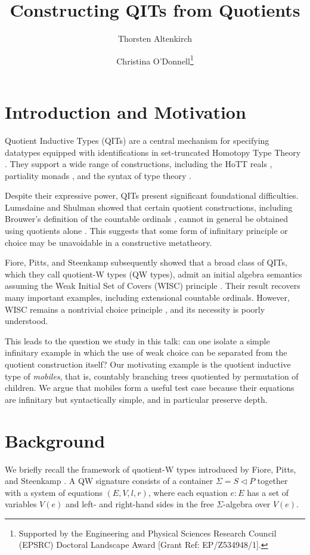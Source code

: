 \documentclass{easychair}
\title{Constructing QITs from Quotients}
\author{
    Thorsten Altenkirch\inst{1}
\and
    Christina O'Donnell\inst{1}\thanks{Supported by the Engineering and Physical Sciences Research Council (EPSRC) Doctoral Landscape Award [Grant Ref: EP/Z534948/1].}
}
\institute{
    University of Nottingham, UK\\
    \email{\{psztxa,psxco3\}@nottingham.ac.uk}
}
\begin{document}
\maketitle

\section{Introduction and Motivation}

Quotient Inductive Types (QITs) are a central mechanism for specifying
datatypes equipped with identifications in set-truncated Homotopy Type
Theory \cite{hott2013-book}. They support a wide range of constructions,
including the HoTT reals \cite{hott2013-book}, partiality monads
\cite{altenkirch2017-partiality-monad}, and the syntax of type theory
\cite{altenkirch2018-qiit}.

Despite their expressive power, QITs present significant foundational
difficulties. Lumsdaine and Shulman showed that certain quotient
constructions, including Brouwer's definition of the countable ordinals
\cite{kraus2023-ordinal}, cannot in general be obtained using quotients
alone \cite{lumsdaine2020-hit}. This suggests that some form of
infinitary principle or choice may be unavoidable in a constructive
metatheory.

Fiore, Pitts, and Steenkamp subsequently showed that a broad class of
QITs, which they call quotient-W types (QW types), admit an initial
algebra semantics assuming the Weak Initial Set of Covers (WISC)
principle \cite{fiore2022-quotients-inductive-types}. Their result
recovers many important examples, including extensional countable
ordinals. However, WISC remains a nontrivial choice principle
\cite{vandenberg2012-wisc-axiom}, and its necessity is poorly
understood.

This leads to the question we study in this talk: can one isolate a
simple infinitary example in which the use of weak choice can be
separated from the quotient construction itself? Our motivating example
is the quotient inductive type of \emph{mobiles}, that is, countably
branching trees quotiented by permutation of children. We argue that
mobiles form a useful test case because their equations are infinitary
but syntactically simple, and in particular preserve depth.

\section{Background}

We briefly recall the framework of quotient-W types introduced by Fiore,
Pitts, and Steenkamp \cite{fiore2022-quotients-inductive-types}. A QW
signature consists of a container \(\Sigma = S \triangleleft P\)
\cite{abbott2005-containers} together with a system of equations
\((E, V, l, r)\), where each equation \(e : E\) has a set of variables
\(V(e)\) and left- and right-hand sides in the free
\(\Sigma\)-algebra over \(V(e)\).
\end{document}
